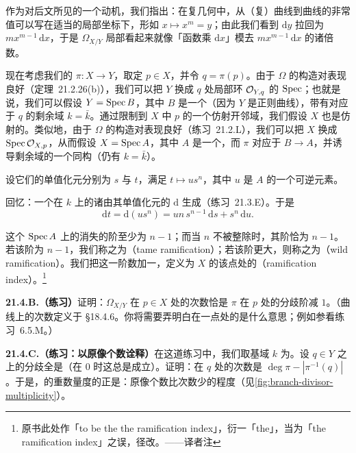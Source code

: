 作为对后文所见的一个动机，我们指出：在复几何中，从（复）曲线到曲线的非常值\trMap{}可以写在适当的局部坐标下，形如 $x\mapsto x^m=y$；由此我们看到 $\mathrm{d}y$ 拉回为 $mx^{m-1}\,\mathrm{d}x$，于是 $\Omega_{X/Y}$ 局部看起来就像「函数乘 $\mathrm{d}x$」模去 $mx^{m-1}\,\mathrm{d}x$ 的诸倍数。

现在考虑我们的\trMap{} $\pi\colon X\to Y$，取定 $p\in X$，并令 $q=\pi(p)$。由于 $\Omega$ 的构造对\trBaseChange{}表现良好（\mbox{定理~21.2.26(b)}），我们可以把 $Y$ 换成 $q$ 处局部环 $\mathcal{O}_{Y,q}$ 的 $\operatorname{Spec}$；也就是说，我们可以假设 $Y=\operatorname{Spec} B$，其中 $B$ 是一个\trDVR（因为 $Y$ 是正则曲线），带有对应于 $q$ 的剩余域 $k=\bar{k}$。通过限制到 $X$ 中 $p$ 的一个仿射开邻域，我们假设 $X$ 也是仿射的。类似地，由于 $\Omega$ 的构造对\trLocalization{}表现良好（\mbox{练习~21.2.L}），我们可以把 $X$ 换成 $\operatorname{Spec}\mathcal{O}_{X,p}$，从而假设 $X=\operatorname{Spec} A$，其中 $A$ 是一个\trDVR，而 $\pi$ 对应于 $B\to A$，并诱导剩余域的一个同构（仍有 $k=\bar{k}$）。

设它们的单值化元分别为 $s$ 与 $t$，满足 $t\mapsto us^n$，其中 $u$ 是 $A$ 的一个可逆元素。

回忆：一个\trDVR{}在 $k$ 上的诸\trDifferential{}由其单值化元的 $\mathrm{d}$ 生成（\mbox{练习~21.3.E}）。于是
\[
\mathrm{d}t=\mathrm{d}(us^n)=un\,s^{n-1}\,\mathrm{d}s+s^n\,\mathrm{d}u.
\]

这个 $\operatorname{Spec} A$ 上的\trDifferential{}消失的阶至少为 $n-1$；而当 $n$ 不被\trCharacteristic{}整除时，其阶恰为 $n-1$。若该阶为 $n-1$，我们称之为\textbf{\trTame\trRamification}（tame ramification）；若该阶更大，则称之为\textbf{\trWild\trRamification}（wild ramification）。我们把这一阶数加一，定义为 $X$ 的该点处的\textbf{\trRamificationIndex}（ramification index）。\footnote{原书此处作「to be the the ramification index」，衍一「the」，当为「the ramification index」之误，径改。——译者注}

\textbf{21.4.B.（练习）}\quad 证明：$\Omega_{X/Y}$ 在 $p\in X$ 处的次数恰是 $\pi$ 在 $p$ 处的分歧阶减 $1$。（曲线上\trCoherentSheaf{}的次数定义于 \S18.4.6。你将需要弄明白\trCoherentSheaf{}在一点处的\trLength{}是什么意思；例如参看\mbox{练习~6.5.M}。）

\textbf{21.4.C.（练习：以原像个数诠释\trRamificationDivisor）}\quad 在这道练习中，我们取基域 $k$ 为\trAlgClosedField。设 $q\in Y$ 之上的分歧全是\trTame\trRamification（在\trCharacteristic{} $0$ 时这总是成立）。证明：\trBranchDivisor{}在 $q$ 处的次数是 $\deg\pi-|\pi^{-1}(q)|$。于是，\trBranchDivisor{}的重数量度的正是：原像个数比次数少的程度（见\cref{fig:branch-divisor-multiplicity}）。

